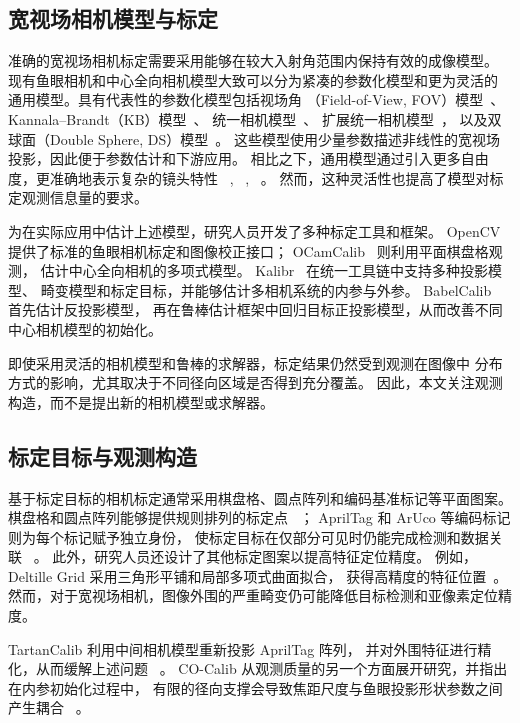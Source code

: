 \documentclass[letterpaper, 10 pt, conference]{ieeeconf}  %
\begin{document}
\subsection{宽视场相机模型与标定}

准确的宽视场相机标定需要采用能够在较大入射角范围内保持有效的成像模型。
现有鱼眼相机和中心全向相机模型大致可以分为紧凑的参数化模型和更为灵活的
通用模型。具有代表性的参数化模型包括视场角
（Field-of-View, FOV）模型~\cite{devernay2001straight}、
Kannala--Brandt（KB）模型~\cite{kannala2006generic}、
统一相机模型~\cite{mei2007single}、
扩展统一相机模型~\cite{khomutenko2016enhanced}，
以及双球面（Double Sphere, DS）模型~\cite{usenko2018double}。
这些模型使用少量参数描述非线性的宽视场投影，因此便于参数估计和下游应用。
相比之下，通用模型通过引入更多自由度，更准确地表示复杂的镜头特性
~\cite{scaramuzza2006flexible},
~\cite{schops2020having},
~\cite{ramalingam2016unifying}。
然而，这种灵活性也提高了模型对标定观测信息量的要求。

为在实际应用中估计上述模型，研究人员开发了多种标定工具和框架。
OpenCV~\cite{bradski2000opencv} 提供了标准的鱼眼相机标定和图像校正接口；
OCamCalib~\cite{scaramuzza2006toolbox} 则利用平面棋盘格观测，
估计中心全向相机的多项式模型。
Kalibr~\cite{rehder2016extending} 在统一工具链中支持多种投影模型、
畸变模型和标定目标，并能够估计多相机系统的内参与外参。
BabelCalib~\cite{lochman2021babelcalib} 首先估计反投影模型，
再在鲁棒估计框架中回归目标正投影模型，从而改善不同中心相机模型的初始化。

即使采用灵活的相机模型和鲁棒的求解器，标定结果仍然受到观测在图像中
分布方式的影响，尤其取决于不同径向区域是否得到充分覆盖。
因此，本文关注观测构造，而不是提出新的相机模型或求解器。

\subsection{标定目标与观测构造}

基于标定目标的相机标定通常采用棋盘格、圆点阵列和编码基准标记等平面图案。
棋盘格和圆点阵列能够提供规则排列的标定点
~\cite{zhang2000flexible,heikkila2000geometric}；
AprilTag 和 ArUco 等编码标记则为每个标记赋予独立身份，
使标定目标在仅部分可见时仍能完成检测和数据关联
~\cite{olson2011apriltag,garrido2014automatic}。
此外，研究人员还设计了其他标定图案以提高特征定位精度。
例如，Deltille Grid 采用三角形平铺和局部多项式曲面拟合，
获得高精度的特征位置~\cite{ha2017deltille}。
然而，对于宽视场相机，图像外围的严重畸变仍可能降低目标检测和亚像素定位精度。

TartanCalib 利用中间相机模型重新投影 AprilTag 阵列，
并对外围特征进行精化，从而缓解上述问题
~\cite{duisterhof2022tartancalib}。
CO-Calib 从观测质量的另一个方面展开研究，并指出在内参初始化过程中，
有限的径向支撑会导致焦距尺度与鱼眼投影形状参数之间产生耦合
~\cite{liu2026observation}。
\end{document}
